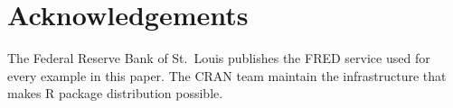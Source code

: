 \section*{Acknowledgements}\label{acknowledgements}

The Federal Reserve Bank of St.~Louis publishes the FRED service
used for every example in this paper. The CRAN team maintain the
infrastructure that makes R package distribution possible.



\address{%
Charles Coverdale\\
Independent\\%
London, United Kingdom\\
%
\url{https://github.com/charlescoverdale/nowcast}\\%
%
\href{mailto:charles.f.coverdale@gmail.com}{\nolinkurl{charles.f.coverdale@gmail.com}}%
}
